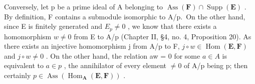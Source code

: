 Conversely, let p be a prime ideal of A belonging to \(\operatorname{Ass}(\mathbf{F}) \cap \operatorname{Supp}(\mathbf{E})\) . By definition, F contains a submodule isomorphic to A/p.~On the other hand, since E is finitely generated and \(E_{p} \neq 0\) , we know that there exists a homomorphism \(w \neq 0\) from E to A/p (Chapter II, §4, no. 4, Proposition 20). As there exists an injective homomorphism j from A/p to F, \(j \circ w \in \operatorname{Hom}(\mathbf{E}, \mathbf{F})\) and \(j \circ w \neq 0\) . On the other hand, the relation aw = 0 for some \(a \in A\) is equivalent to \(a \in p\) , the annihilator of every element \(\neq 0\) of A/p being p; then certainly \(p \in \operatorname{Ass}(\operatorname{Hom}_{\mathbf{A}}(\mathbf{E}, \mathbf{F}))\) .

